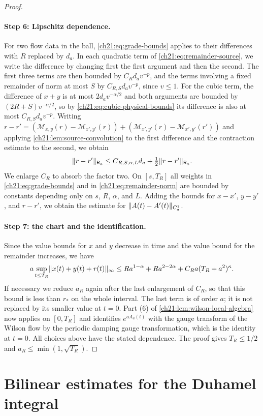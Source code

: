 \begin{proof}
\paragraph{Step 6: Lipschitz dependence.}
For two flow data in the ball, \eqref{ch21:eq:grade-bounds} applies to their differences with $R$ replaced by $d_a$. In each quadratic term of \eqref{ch21:eq:remainder-source}, we write the difference by changing first the first argument and then the second. The first three terms are then bounded by $C_Rd_av^{-p}$, and the terms involving a fixed remainder of norm at most $S$ by $C_{R,S}d_av^{-p}$, since $v\le1$. For the cubic term, the difference of $x+y$ is at most $2d_av^{-\alpha/2}$ and both arguments are bounded by $(2R+S)v^{-\alpha/2}$, so by \eqref{ch21:eq:cubic-physical-bounds} its difference is also at most $C_{R,S}d_av^{-p}$. Writing $r-r'=(\mathscr M_{x,y}(r)-\mathscr M_{x',y'}(r))+(\mathscr M_{x',y'}(r)-\mathscr M_{x',y'}(r'))$ and applying \cref{ch21:lem:source-convolution} to the first difference and the contraction estimate to the second, we obtain
\[
 \lVert r-r'\rVert_{\mathsf R_a}\le C_{R,S,\alpha,L}d_a+\tfrac12\lVert r-r'\rVert_{\mathsf R_a}.
\]
We enlarge $C_R$ to absorb the factor two. On $[s,T_R]$ all weights in \eqref{ch21:eq:grade-bounds} and in \eqref{ch21:eq:remainder-norm} are bounded by constants depending only on $s$, $R$, $\alpha$, and $L$. Adding the bounds for $x-x'$, $y-y'$, and $r-r'$, we obtain the estimate for $\lVert A(t)-A'(t)\rVert_{C_a^1}$.

\paragraph{Step 7: the chart and the identification.}
Since the value bounds for $x$ and $y$ decrease in time and the value bound for the remainder increases, we have
\[
 a\sup_{t\le T_R}\lVert x(t)+y(t)+r(t)\rVert_\infty\le Ra^{1-\alpha}+Ra^{2-2\alpha}+C_Ra(T_R+a^2)^\kappa .
\]
If necessary we reduce $a_R$ again after the last enlargement of $C_R$, so that this bound is less than $r_*$ on the whole interval. The last term is of order $a$; it is not replaced by its smaller value at $t=0$. Part (6) of \cref{ch21:lem:wilson-local-algebra} now applies on $[0,T_R]$ and identifies $e^{aA_a(t)}$ with the gauge transform of the Wilson flow by the periodic damping gauge transformation, which is the identity at $t=0$. All choices above have the stated dependence. The proof gives $T_R\le1/2$ and $a_R\le\min(1,\sqrt{T_R})$.
\end{proof}

\section{Bilinear estimates for the Duhamel integral}\label{ch21:sec:bilinear}

